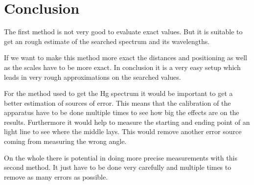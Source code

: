 \section{Conclusion}
The first method is not very good to evaluate exact values. 
But it is suitable to get an rough estimate of the searched spectrum and its wavelengths.

If we want to make this method more exact the distances and positioning as well as the scales have to be more exact. 
In conclusion it is a very easy setup which leads in very rough approximations on the searched values.



For the method used to get the Hg spectrum it would be important to get a better estimation of sources of error.
This means that the calibration of the apparatus have to be done multiple times to see how big the effects are on the results. 
Furthermore it would help to measure the starting and ending point of an light line to see where the middle lays.
This would remove another error source coming from measuring the wrong angle.

On the whole there is potential in doing more precise measurements with this second method. 
It just have to be done very carefully and multiple times to remove as many errors as possible.
